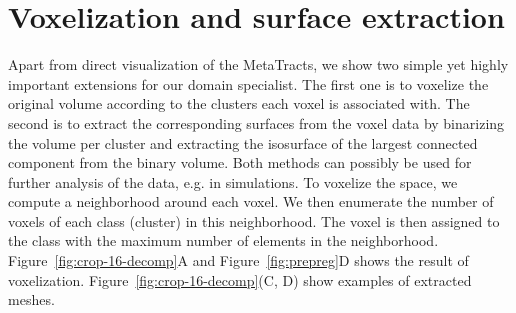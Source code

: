 \section {Voxelization and surface extraction}
\label{sec:vis}
Apart from direct visualization of the MetaTracts, we show two simple yet highly important extensions for our domain specialist. The first one is to voxelize the original volume according to the clusters each voxel is associated with.
The second is to extract the corresponding surfaces from the voxel data by binarizing the volume per cluster and extracting the isosurface of the largest connected component from the binary volume. Both methods can possibly be used for further analysis of the data, e.g. in simulations.
To voxelize the space,  we compute a neighborhood around each voxel. We then enumerate the number of voxels of each class (cluster) in this neighborhood. The voxel is then assigned to the class with the maximum number of elements in the neighborhood. Figure~\ref{fig:crop-16-decomp}A and Figure~\ref{fig:prepreg}D shows the result of voxelization. Figure~\ref{fig:crop-16-decomp}(C, D) show examples of extracted meshes.
%
%
%
